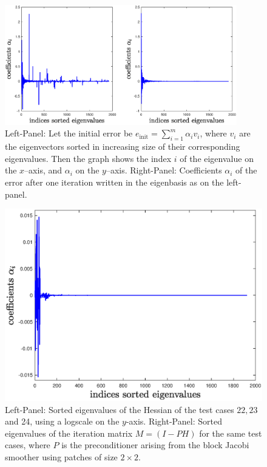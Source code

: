 \documentclass[../draft_1.tex]{subfiles}
\begin{document}
\begin{figure}
	\includegraphics[width=0.9\textwidth]{images/implementation/eigenvalues/coeff_left_init_error_right_error_1_it}
	\caption{Left-Panel: Let the initial error be $e_{\text{init}} = \sum_{i=1}^{m} \alpha_i v_i$, where $v_i$ are the eigenvectors sorted in increasing size of their corresponding eigenvalues. Then the graph shows the index $i$ of the eigenvalue on the $x$--axis, and $\alpha_i$ on the $y$--axis. Right-Panel: Coefficients $\alpha_i$ of the error after one iteration written in the eigenbasis as on the left-panel.}
	\label{fig:coeff_analysis_init_error}
\end{figure}

\begin{figure}
	\centering
	\includegraphics[scale=0.4]{images/implementation/eigenvalues/coeff_error_after_50_it}
	\caption{Left-Panel: Sorted eigenvalues of the Hessian of the test cases $22, 23$ and 24, using a logscale on the $y$-axis. Right-Panel: Sorted eigenvalues of the iteration matrix $M = (I - PH)$ for the same test cases, where $P$ is the preconditioner arising from the block Jacobi smoother using patches of size $2 \times 2$.}
	\label{fig:coeff_analysis}
\end{figure}
\end{document}
